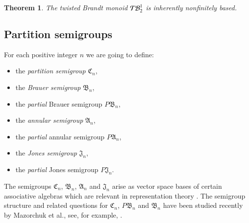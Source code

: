 \documentclass[preprint,1p,times]{elsarticle}
\numberwithin{equation}{section}
\newtheorem{Thm}{Theorem}[section]
\theoremstyle{remark}
\def\si{\sigma}
\def\Rm{Rees matrix}
\def\A{\mathfrak{A}}
\def\C{\mathfrak{C}}
\def\B{\mathfrak{B}}
\def\J{\mathfrak{J}}
\def\TB{\ensuremath{\mathcal{T\kern-1pt B}_2^1}}
\def\nfb{non\-finitely based}
\begin{document}
\begin{Thm}\label{TB2}
The twisted Brandt monoid $\TB$ is inherently \nfb.
\end{Thm}


\subsection{Partition semigroups}

For each positive integer $n$ we are going to define:
\begin{itemize}
\item the \emph{partition semigroup} $\C_n$,
\item the \emph{Brauer semigroup} $\B_n$,
\item the \emph{partial} Brauer semigroup $P\B_n$,
\item the \emph{annular semigroup} $\A_n$,
\item the \emph{partial} annular semigroup $P\A_n$,
\item the \emph{Jones semigroup} $\J_n$,
\item the \emph{partial} Jones semigroup $P\J_n$.
\end{itemize}
The semigroups $\C_n$, $\B_n$, $\A_n$ and $\J_n$ arise as vector space bases of certain associative algebras which are
relevant in representation theory \cite{brauer, xi, jones, grahamlehrer}. The semigroup structure and related questions
for $\C_n$, $P\B_n$ and $\B_n$ have been studied recently by Mazorchuk et al., see, for example, \cite{Maz1, Maz2, KMM,
KM2,malcevmazorchuk, fitzgerald}.
\end{document}
